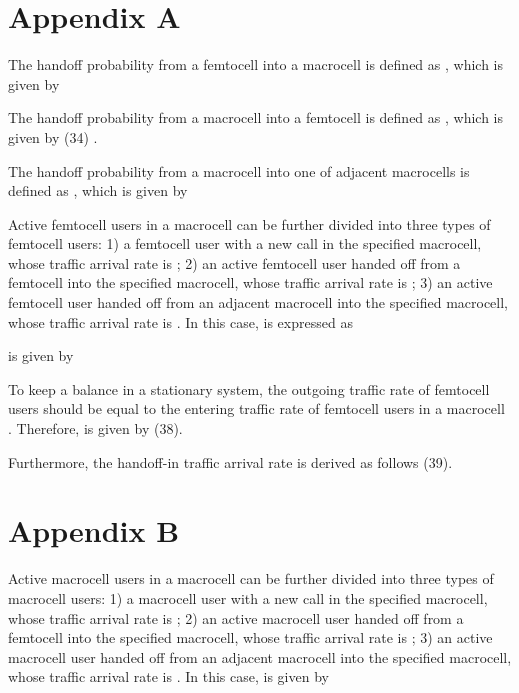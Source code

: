 \documentclass[10pt,final,journal,letterpaper,twoside,twocolumn]{IEEEtran}
\begin{document}
\section*{Appendix A}
The handoff probability from a femtocell into a macrocell is
defined as , which is given by \cite{Zhang10}


The handoff probability from a macrocell into a femtocell is defined as
, which is given by (34) \cite{Zhang10}.

The handoff probability from a macrocell into one of adjacent macrocells is defined as
, which is given by \cite{Zhang10}

\begin{figure*}[!t]











\end{figure*}


Active femtocell users in a macrocell can be further divided into three types of femtocell
users: 1) a femtocell user with a new call in the specified macrocell, whose traffic
arrival rate is ; 2) an active femtocell user handed off
from a femtocell into the specified macrocell, whose traffic arrival rate is ; 3) an active femtocell user handed off from an adjacent
macrocell into the specified macrocell, whose traffic arrival rate is . In this case,  is expressed as

 is given by


To keep a balance in a stationary system, the outgoing traffic rate of
femtocell users should be equal to the entering traffic rate of femtocell
users in a macrocell \cite{Lin10}. Therefore,  is given by (38).

Furthermore, the handoff-in traffic arrival rate  is
derived as follows (39).


\section*{Appendix B}
Active macrocell users in a macrocell can be further divided into three types of macrocell
users: 1) a macrocell user with a new call in the specified macrocell, whose traffic
arrival rate is ; 2) an active macrocell user handed off
from a femtocell into the specified macrocell, whose traffic arrival rate is ; 3) an active macrocell user handed off from an adjacent
macrocell into the specified macrocell, whose traffic arrival rate is . In this case,  is given by
\end{document}
